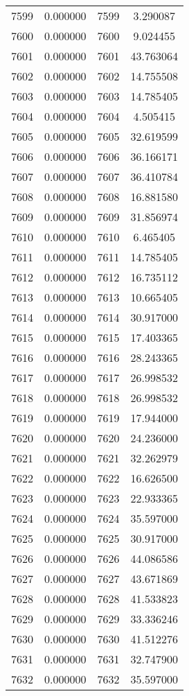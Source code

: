 \documentclass[12pt]{article}
\begin{document}
\begin{longtable}{@{}cccc@{}}
7599 & 0.000000 & 7599 & 3.290087 \\
7600 & 0.000000 & 7600 & 9.024455 \\
7601 & 0.000000 & 7601 & 43.763064 \\
7602 & 0.000000 & 7602 & 14.755508 \\
7603 & 0.000000 & 7603 & 14.785405 \\
7604 & 0.000000 & 7604 & 4.505415 \\
7605 & 0.000000 & 7605 & 32.619599 \\
7606 & 0.000000 & 7606 & 36.166171 \\
7607 & 0.000000 & 7607 & 36.410784 \\
7608 & 0.000000 & 7608 & 16.881580 \\
7609 & 0.000000 & 7609 & 31.856974 \\
7610 & 0.000000 & 7610 & 6.465405 \\
7611 & 0.000000 & 7611 & 14.785405 \\
7612 & 0.000000 & 7612 & 16.735112 \\
7613 & 0.000000 & 7613 & 10.665405 \\
7614 & 0.000000 & 7614 & 30.917000 \\
7615 & 0.000000 & 7615 & 17.403365 \\
7616 & 0.000000 & 7616 & 28.243365 \\
7617 & 0.000000 & 7617 & 26.998532 \\
7618 & 0.000000 & 7618 & 26.998532 \\
7619 & 0.000000 & 7619 & 17.944000 \\
7620 & 0.000000 & 7620 & 24.236000 \\
7621 & 0.000000 & 7621 & 32.262979 \\
7622 & 0.000000 & 7622 & 16.626500 \\
7623 & 0.000000 & 7623 & 22.933365 \\
7624 & 0.000000 & 7624 & 35.597000 \\
7625 & 0.000000 & 7625 & 30.917000 \\
7626 & 0.000000 & 7626 & 44.086586 \\
7627 & 0.000000 & 7627 & 43.671869 \\
7628 & 0.000000 & 7628 & 41.533823 \\
7629 & 0.000000 & 7629 & 33.336246 \\
7630 & 0.000000 & 7630 & 41.512276 \\
7631 & 0.000000 & 7631 & 32.747900 \\
7632 & 0.000000 & 7632 & 35.597000 \\

\end{longtable}
\end{document}
